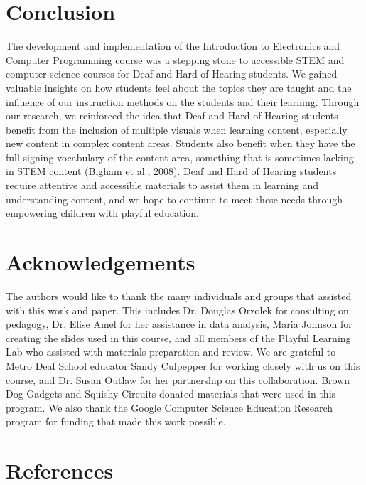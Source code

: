 \documentclass[11.5pt]{sig-alternate}
\begin{document}
\begin{large}
\section*{ Conclusion}

The development and implementation of the Introduction to Electronics and Computer Programming course was a stepping stone to accessible STEM and computer science courses for Deaf and Hard of Hearing students. We gained valuable insights on how students feel about the topics they are taught and the influence of our instruction methods on the students and their learning. Through our research, we reinforced the idea that Deaf and Hard of Hearing students benefit from the inclusion of multiple visuals when learning content, especially new content in complex content areas. Students also benefit when they have the full signing vocabulary of the content area, something that is sometimes lacking in STEM content (Bigham et al., 2008). Deaf and Hard of Hearing students require attentive and accessible materials to assist them in learning and understanding content, and we hope to continue to meet these needs through empowering children with playful education.
\newpage
\section*{ Acknowledgements}

The authors would like to thank the many individuals and groups that assisted with this work and paper. This includes Dr. Douglas Orzolek for consulting on pedagogy, Dr. Elise Amel for her assistance in data analysis, Maria Johnson for creating the slides used in this course, and all members of the Playful Learning Lab who assisted with materials preparation and review. We are grateful to Metro Deaf School educator Sandy Culpepper for working closely with us on this course, and Dr. Susan Outlaw for her partnership on this collaboration. Brown Dog Gadgets and Squishy Circuits donated materials that were used in this program. We also thank the Google Computer Science Education Research program for funding that made this work possible.

\end{large}
 
\section*{ References}\par 

\leftskip 0.25in
\parindent -0.25in 
\end{document}
